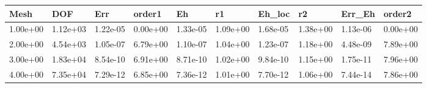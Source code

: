 \begin{tabular}{llllllllll}
Mesh & DOF & Err & order1 & Eh & r1 & Eh_loc & r2 & Err_Eh & order2 \\ 
\hline 
1.00e+00 & 1.12e+03 & 1.22e-05 & 0.00e+00 & 1.33e-05 & 1.09e+00 & 1.68e-05 & 1.38e+00 & 1.13e-06 & 0.00e+00 \\ 
2.00e+00 & 4.54e+03 & 1.05e-07 & 6.79e+00 & 1.10e-07 & 1.04e+00 & 1.23e-07 & 1.18e+00 & 4.48e-09 & 7.89e+00 \\ 
3.00e+00 & 1.83e+04 & 8.54e-10 & 6.91e+00 & 8.71e-10 & 1.02e+00 & 9.84e-10 & 1.15e+00 & 1.75e-11 & 7.96e+00 \\ 
4.00e+00 & 7.35e+04 & 7.29e-12 & 6.85e+00 & 7.36e-12 & 1.01e+00 & 7.70e-12 & 1.06e+00 & 7.44e-14 & 7.86e+00 \\ 
\hline 
\end{tabular}
